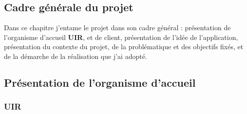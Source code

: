 \documentclass[a4paper]{report}
\begin{document}
\begin{doublespace}
	\newpage
	\chapter{Cadre générale du projet}
	\renewcommand{\headrulewidth}{1pt}
	\fancyhead[L]{\hspace*{5cm}}
	Dans ce chapitre j'entame le projet dans son cadre général : présentation
	de l’organisme d’accueil \textbf{UIR},
	et de client, présentation de l'idée de l'application, présentation du
	contexte du projet, de la problématique et des objectifs fixés,
	et de la démarche de la réalisation que j'ai adopté.
	\section{Présentation de l’organisme d’accueil}
	\subsection{UIR}


\end{doublespace}
\end{document}

